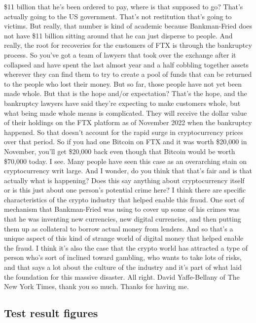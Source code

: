\$11 billion that he’s been ordered to pay, where is that supposed to go? That’s actually going to the US government. That’s not restitution that’s going to victims. But really, that number is kind of academic because Bankman-Fried does not have \$11 billion sitting around that he can just disperse to people. And really, the root for recoveries for the customers of FTX is through the bankruptcy process. So you’ve got a team of lawyers that took over the exchange after it collapsed and have spent the last almost year and a half cobbling together assets wherever they can find them to try to create a pool of funds that can be returned to the people who lost their money. But so far, those people have not yet been made whole. But that is the hope and/or expectation? That’s the hope, and the bankruptcy lawyers have said they’re expecting to make customers whole, but what being made whole means is complicated. They will receive the dollar value of their holdings on the FTX platform as of November 2022 when the bankruptcy happened. So that doesn’t account for the rapid surge in cryptocurrency prices over that period. So if you had one Bitcoin on FTX and it was worth \$20,000 in November, you’ll get \$20,000 back even though that Bitcoin would be worth \$70,000 today. I see. Many people have seen this case as an overarching stain on cryptocurrency writ large. And I wonder, do you think that that’s fair and is that actually what is happening? Does this say anything about cryptocurrency itself or is this just about one person’s potential crime here? I think there are specific characteristics of the crypto industry that helped enable this fraud. One sort of mechanism that Bankman-Fried was using to cover up some of his crimes was that he was inventing new currencies, new digital currencies, and then putting them up as collateral to borrow actual money from lenders. And so that’s a unique aspect of this kind of strange world of digital money that helped enable the fraud. I think it’s also the case that the crypto world has attracted a type of person who’s sort of inclined toward gambling, who wants to take lots of risks, and that says a lot about the culture of the industry and it’s part of what laid the foundation for this massive disaster. All right. David Yaffe-Bellany of The New York Times, thank you so much. Thanks for having me.

\subsection{Test result figures}

